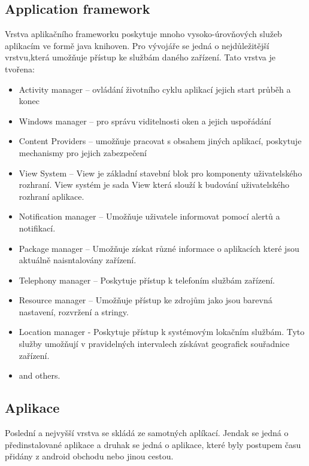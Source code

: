 \subsection{Application framework}
Vrstva aplikačního frameworku poskytuje mnoho vysoko-úrovňových služeb aplikacím ve formě java knihoven. Pro vývojáře se jedná o nejdůležitější vrstvu,která umožňuje přístup ke službám daného zařízení. Tato vrstva je tvořena: 
\begin{itemize} %
\item Activity manager -- ovládání životního cyklu aplikací jejich start průběh a konec
\item Windows manager -- pro správu viditelnosti oken a jejich uspořádání
\item Content Providers -- umožňuje pracovat s obsahem jiných aplikací, poskytuje mechanismy pro jejich zabezpečení 
\item View System -- View je základní stavební blok pro komponenty uživatelského rozhraní. View systém je sada View která slouží k budování uživatelského rozhraní aplikace.
\item Notification manager -- Umožňuje uživatele informovat pomocí alertů a notifikací.
\item Package manager -- Umožňuje získat různé informace o aplikacích které jsou aktuálně naisntalovány  zařízení.
\item Telephony manager -- Poskytuje přístup k telefoním službám zařízení. 
\item Resource manager -- Umožňuje přístup ke zdrojům jako jsou barevná nastavení, rozvržení a stringy.
\item Location manager - Poskytuje přístup k systémovým lokačním službám. Tyto služby umožňují v pravidelných intervalech získávat geografick souřadnice zařízení.
\item and others.
\end{itemize}

\subsection{Aplikace}
Poslední a nejvyšší vrstva se skládá ze samotných aplíkací. Jendak se jedná o předinstalované aplikace a druhak se jedná o aplikace, které byly postupem času přidány z android obchodu nebo jinou cestou.


